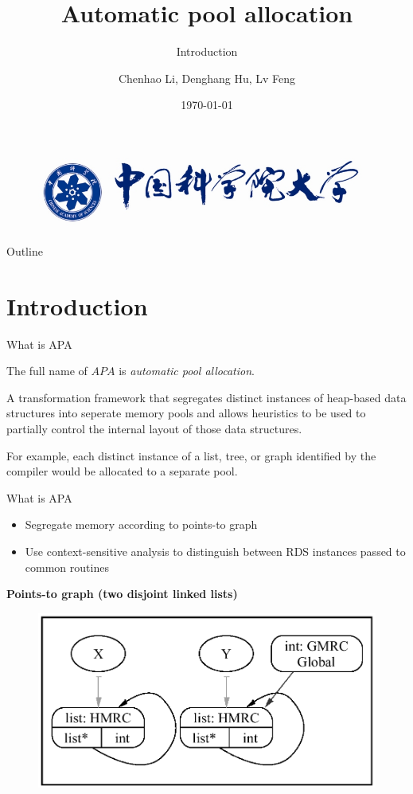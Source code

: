 \documentclass{beamer}
\title{Automatic pool allocation}
\subtitle{Introduction}
\institute{University of Chinese Academy of Sciences}
\author{Chenhao Li, Denghang Hu, Lv Feng}
\date{\today}
\begin{document}

\begin{frame}
  \titlepage
  \begin{figure}[ht]\centering\includegraphics[scale=0.3]{./fig/ucas.jpg}\end{figure}
\end{frame}

\begin{frame}{Outline}
  \tableofcontents
\end{frame}
 
\section{Introduction}

\begin{frame}{What is APA}
  \begin{block}{}
	The full name of $APA$ is \emph{automatic pool allocation}.
  \end{block}
  \begin{block}
	{} A transformation
framework that segregates distinct instances of heap-based data
structures into seperate memory pools and allows heuristics to be
used to partially control the internal layout of those data structures.
  \end{block}

  For example, each distinct instance of a list, tree, or graph identified by
the compiler would be allocated to a separate pool.

\end{frame}

\begin{frame}{What is APA}
  \begin{itemize}
	\item Segregate memory according to points-to graph
	  \item Use context-sensitive analysis to distinguish between RDS instances passed to common routines
  \end{itemize}
	\textbf{Points-to graph (two disjoint linked lists)}
	\begin{figure}[H]
	  \centering
	  \includegraphics[scale=0.2]{./fig/4.png}
	\end{figure}
\end{frame}
\end{document}
